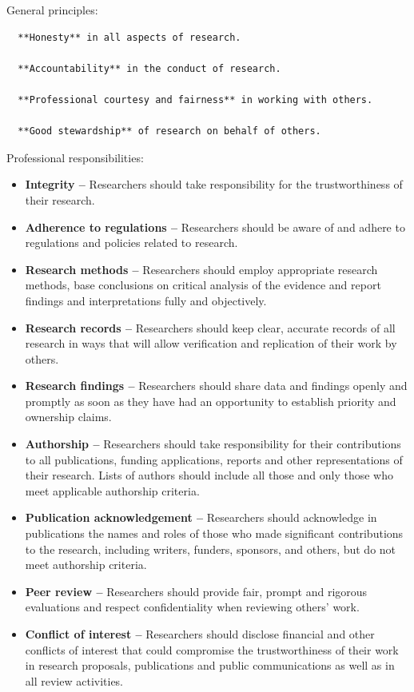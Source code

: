\documentclass[
]{book}
\begin{document}
General principles:

\begin{verbatim}
  **Honesty** in all aspects of research.

  **Accountability** in the conduct of research.

  **Professional courtesy and fairness** in working with others.

  **Good stewardship** of research on behalf of others.
\end{verbatim}

Professional responsibilities:

\begin{itemize}
\item
  \textbf{Integrity --} Researchers should take responsibility for the trustworthiness of their research.
\item
  \textbf{Adherence to regulations --} Researchers should be aware of and adhere to regulations and policies related to research.
\item
  \textbf{Research methods --} Researchers should employ appropriate research methods, base conclusions on critical analysis of the evidence and report findings and interpretations fully and objectively.
\item
  \textbf{Research records --} Researchers should keep clear, accurate records of all research in ways that will allow verification and replication of their work by others.
\item
  \textbf{Research findings --} Researchers should share data and findings openly and promptly as soon as they have had an opportunity to establish priority and ownership claims.
\item
  \textbf{Authorship --} Researchers should take responsibility for their contributions to all publications, funding applications, reports and other representations of their research. Lists of authors should include all those and only those who meet applicable authorship criteria.
\item
  \textbf{Publication acknowledgement --} Researchers should acknowledge in publications the names and roles of those who made significant contributions to the research, including writers, funders, sponsors, and others, but do not meet authorship criteria.
\item
  \textbf{Peer review --} Researchers should provide fair, prompt and rigorous evaluations and respect confidentiality when reviewing others' work.
\item
  \textbf{Conflict of interest --} Researchers should disclose financial and other conflicts of interest that could compromise the trustworthiness of their work in research proposals, publications and public communications as well as in all review activities.

\end{itemize}
\end{document}
